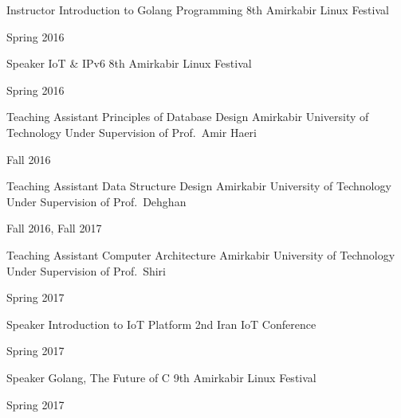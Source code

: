 \begin{cventries}
  \cventry%
    {Instructor} %
    {Introduction to Golang Programming} %
    {8th Amirkabir Linux Festival} %
    {} %
    {%
      \begin{cvitems} %
        Spring 2016
      \end{cvitems}
    }

  \cventry%
    {Speaker} %
    {IoT \& IPv6} %
    {8th Amirkabir Linux Festival} %
    {} %
    {%
      \begin{cvitems} %
        Spring 2016
      \end{cvitems}
    }

  \cventry%
    {Teaching Assistant} %
    {Principles of Database Design} %
    {Amirkabir University of Technology} %
    {Under Supervision of Prof.\ Amir Haeri} %
    {%
      \begin{cvitems} %
        Fall 2016
      \end{cvitems}
    }

  \cventry%
    {Teaching Assistant} %
    {Data Structure Design} %
    {Amirkabir University of Technology} %
    {Under Supervision of Prof.\ Dehghan} %
    {%
      \begin{cvitems} %
        Fall 2016, Fall 2017
      \end{cvitems}
    }

  \cventry%
    {Teaching Assistant} %
    {Computer Architecture} %
    {Amirkabir University of Technology} %
    {Under Supervision of Prof.\ Shiri} %
    {%
      \begin{cvitems} %
        Spring 2017
      \end{cvitems}
    }

  \cventry%
    {Speaker} %
    {Introduction to IoT Platform} %
    {2nd Iran IoT Conference} %
    {} %
    {%
      \begin{cvitems} %
        Spring 2017
      \end{cvitems}
    }

  \cventry%
    {Speaker} %
    {Golang, The Future of C} %
    {9th Amirkabir Linux Festival} %
    {} %
    {%
      \begin{cvitems} %
        Spring 2017
      \end{cvitems}
    }


\end{cventries}
